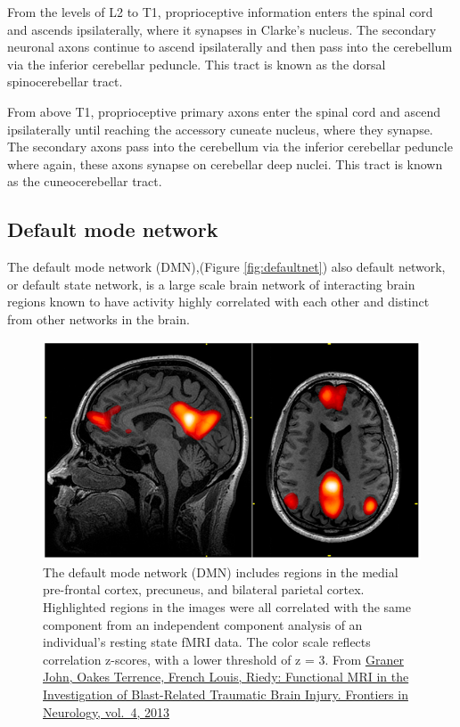 From the levels of L2 to T1, proprioceptive information enters the spinal cord and ascends ipsilaterally, where it synapses in Clarke's nucleus. The secondary neuronal axons continue to ascend ipsilaterally and then pass into the cerebellum via the inferior cerebellar peduncle. This tract is known as the dorsal spinocerebellar tract.

From above T1, proprioceptive primary axons enter the spinal cord and ascend ipsilaterally until reaching the accessory cuneate nucleus, where they synapse. The secondary axons pass into the cerebellum via the inferior cerebellar peduncle where again, these axons synapse on cerebellar deep nuclei. This tract is known as the cuneocerebellar tract.

\hypertarget{default-mode-network}{%
\subsection{Default mode network}\label{default-mode-network}}

The default mode network (DMN),(Figure \ref{fig:defaultnet}) also default network, or default state network, is a large scale brain network of interacting brain regions known to have activity highly correlated with each other and distinct from other networks in the brain.



\begin{figure}

{\centering \includegraphics[width=0.7\linewidth]{./figures/cns/fneur-04-00016-g002} 

}

\caption{The default mode network (DMN) includes regions in the medial pre-frontal cortex, precuneus, and bilateral parietal cortex. Highlighted regions in the images were all correlated with the same component from an independent component analysis of an individual's resting state fMRI data. The color scale reflects correlation z-scores, with a lower threshold of z = 3. From \href{https://www.frontiersin.org/article/10.3389/fneur.2013.00016}{Graner John, Oakes Terrence, French Louis, Riedy: Functional MRI in the Investigation of Blast-Related Traumatic Brain Injury. Frontiers in Neurology, vol.~4, 2013}}\label{fig:defaultnetwork}
\end{figure}

